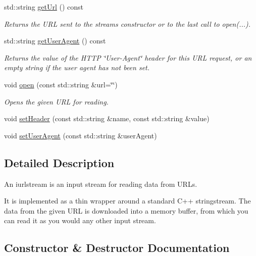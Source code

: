 \begin{DoxyCompactItemize}
std\+::string \mbox{\hyperlink{classiurlstream_a0cbda75589e2fb500bbe875b72f66682}{get\+Url}} () const
\begin{DoxyCompactList}\small\item\em Returns the U\+RL sent to the stream\textquotesingle{}s constructor or to the last call to open(...). \end{DoxyCompactList}\item 
std\+::string \mbox{\hyperlink{classiurlstream_a479f109234aad1c792be804bf6320c62}{get\+User\+Agent}} () const
\begin{DoxyCompactList}\small\item\em Returns the value of the H\+T\+TP \char`\"{}\+User-\/\+Agent\char`\"{} header for this U\+RL request, or an empty string if the user agent has not been set. \end{DoxyCompactList}\item 
void \mbox{\hyperlink{classiurlstream_a9759fd1c1bf1427fa02340c2dabd47d6}{open}} (const std\+::string \&url=\char`\"{}\char`\"{})
\begin{DoxyCompactList}\small\item\em Opens the given U\+RL for reading. \end{DoxyCompactList}\item 
void \mbox{\hyperlink{classiurlstream_af7065da3945b84ffb547b8bad9ddf8dc}{set\+Header}} (const std\+::string \&name, const std\+::string \&value)
\item 
void \mbox{\hyperlink{classiurlstream_a766286050e9b8fe08919f8353ecb4031}{set\+User\+Agent}} (const std\+::string \&user\+Agent)
\end{DoxyCompactItemize}


\subsection{Detailed Description}
An {\ttfamily iurlstream} is an input stream for reading data from U\+R\+Ls. 

It is implemented as a thin wrapper around a standard C++ stringstream. The data from the given U\+RL is downloaded into a memory buffer, from which you can read it as you would any other input stream. 

\subsection{Constructor \& Destructor Documentation}
\mbox{\label{classiurlstream_aa78011981facda77bed9acf0e88ebdab}} 
